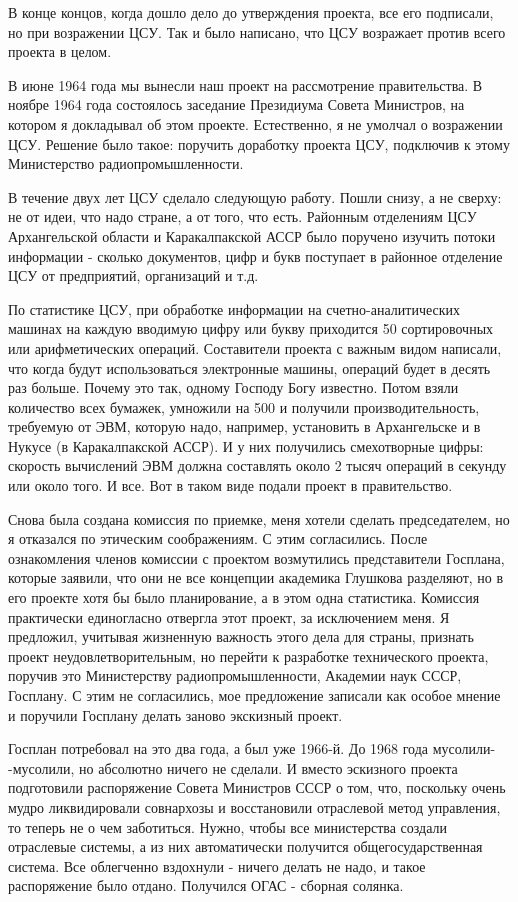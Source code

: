 В конце концов, когда дошло дело до утверждения проекта, все его подписали, но
при возражении ЦСУ. Так и было написано, что ЦСУ возражает против всего проекта
в целом.

В июне 1964 года мы вынесли наш проект на рассмотрение правительства. В ноябре
1964 года состоялось заседание Президиума Совета Министров, на котором я
докладывал об этом проекте. Естественно, я не умолчал о возражении ЦСУ. Решение
было такое: поручить доработку проекта ЦСУ, подключив к этому Министерство
радиопромышленности.

В течение двух лет ЦСУ сделало следующую работу. Пошли снизу, а не сверху: не от
идеи, что надо стране, а от того, что есть. Районным отделениям ЦСУ
Архангельской области и Каракалпакской АССР было поручено изучить потоки
информации - сколько документов, цифр и букв поступает в районное отделение ЦСУ
от предприятий, организаций и т.д.

По статистике ЦСУ, при обработке информации на счетно-ана\-ли\-ти\-чес\-ких
машинах на каждую вводимую цифру или букву приходится 50 сортировочных или
арифметических операций. Составители проекта с важным видом написали, что когда
будут использоваться электронные машины, операций будет в десять раз больше.
Почему это так, одному Господу Богу известно. Потом взяли количество всех
бумажек, умножили на 500 и получили производительность, требуемую от ЭВМ,
которую надо, например, установить в Архангельске и в Нукусе (в Каракалпакской
АССР). И у них получились смехотворные цифры: скорость вычислений ЭВМ должна
составлять около 2 тысяч операций в секунду или около того. И все. Вот в таком
виде подали проект в правительство.

Снова была создана комиссия по приемке, меня хотели сделать председателем, но я
отказался по этическим соображениям. С этим согласились. После ознакомления
членов комиссии с проектом возмутились представители Госплана, которые заявили,
что они не все концепции академика Глушкова разделяют, но в его проекте хотя бы
было планирование, а в этом одна статистика. Комиссия практически единогласно
отвергла этот проект, за исключением меня. Я предложил, учитывая жизненную
важность этого дела для страны, признать проект неудовлетворительным, но перейти
к разработке технического проекта, поручив это Министерству радиопромышленности,
Академии наук СССР, Госплану. С этим не согласились, мое предложение записали
как особое мнение и поручили Госплану делать заново экскизный проект.

Госплан потребовал на это два года, а был уже 1966-й. До 1968 года мусолили-
-мусолили, но абсолютно ничего не сделали. И вместо эскизного проекта
подготовили распоряжение Совета Министров СССР о том, что, поскольку очень мудро
ликвидировали совнархозы и восстановили отраслевой метод управления, то теперь
не о чем заботиться. Нужно, чтобы все министерства создали отраслевые системы, а
из них автоматически получится общегосударственная система. Все облегченно
вздохнули - ничего делать не надо, и такое распоряжение было отдано. Получился
ОГАС - сборная солянка.

